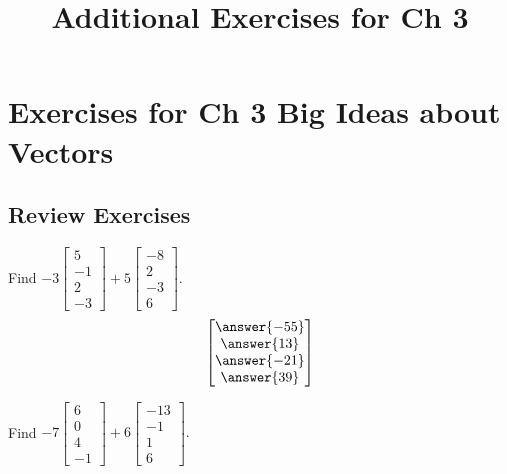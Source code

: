\documentclass{ximera}
\title{Additional Exercises for Ch 3} \license{CC BY-NC-SA 4.0}
\begin{document}
\begin{abstract}
\end{abstract}
\maketitle

\section*{Exercises for Ch 3 Big Ideas about Vectors}

\subsection*{Review Exercises}

\begin{problem}\label{prb:3.1} Find $-3
\begin{bmatrix}
5 \\
-1 \\
2 \\
-3
\end{bmatrix}
 +5
\begin{bmatrix}
-8 \\
2 \\
-3 \\
6
\end{bmatrix}.$
$$\begin{bmatrix}
\answer{-55} \\
\answer{13} \\
\answer{-21} \\
\answer{39}
\end{bmatrix}$$
\end{problem}

\begin{problem}\label{prb:3.2} Find $-7
\begin{bmatrix}
6 \\
0 \\
4 \\
-1
\end{bmatrix} +6
\begin{bmatrix}
-13 \\
-1 \\
1 \\
6
\end{bmatrix}.$
\end{problem}
\end{document}

